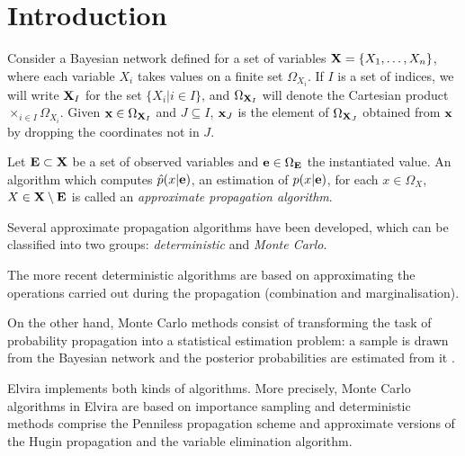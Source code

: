\section{Introduction}

Consider a Bayesian network defined for a set of variables $\mathbf{X}=\{
X_1,\ldots,X_n\}$, where each variable $X_i$ takes values on a
finite set $\Omega_{X_i}$. If $I$ is a set of indices, we will
write $\mathbf{X}_I$ for the set $\{ X_i|i\in I\}$, and $\Omega_{\mathbf{X}_I}$
will denote the Cartesian product $\times_{i\in I}\Omega_{X_i}$.
Given $\mathbf{x}\in \Omega_{\mathbf{X}_I}$ and $J\subseteq I$,  $\mathbf{x}_J$ is the
element of $\Omega_{\mathbf{X}_J}$ obtained from $\mathbf{x}$ by dropping the
coordinates not in $J$.

\begin{definition} \label{def:approximate} Let $\mathbf{E}\subset \mathbf{X}$ be a set
of observed variables and $\mathbf{e}\in\Omega_{\mathbf{E}}$ the instantiated
value. An algorithm which computes $\hat{p}(x|\mathbf{e})$, an estimation
of $p(x|\mathbf{e})$, for each $x\in\Omega_{X}$, $X\in \mathbf{X}\setminus \mathbf{E}$
is called an {\em approximate propagation algorithm}.
\end{definition}

Several approximate propagation algorithms have been developed,
which can be classified into two groups: \textit{deterministic}
and \textit{Monte Carlo}.

The more recent deterministic algorithms \cite{Can00,Can02,Can03}
are based on approximating the operations carried out during the
propagation (combination and marginalisation).

On the other hand, Monte Carlo methods consist of transforming the
task of probability propagation into a statistical estimation
problem: a sample is drawn from the Bayesian network and the
posterior probabilities are estimated from it
\cite{Her98,Jen95,Sal2000,Sal01}.

Elvira implements both kinds of algorithms. More precisely, Monte
Carlo algorithms in Elvira are based on importance sampling and
deterministic methods comprise the Penniless propagation scheme
and approximate versions of the Hugin propagation and the variable
elimination algorithm.
